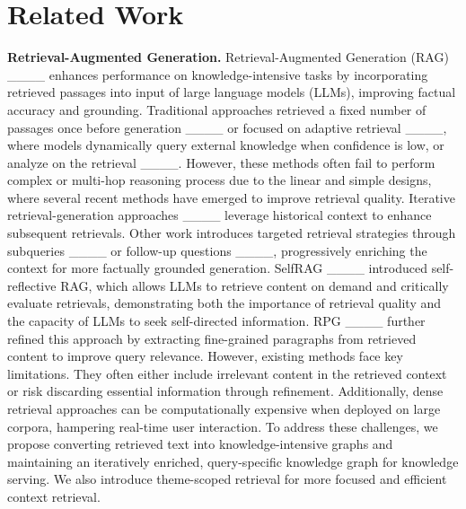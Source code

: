 \section{Related Work}
\textbf{Retrieval-Augmented Generation.} Retrieval-Augmented Generation (RAG) ____ enhances performance on knowledge-intensive tasks by incorporating retrieved passages into input of large language models (LLMs), improving factual accuracy and grounding. Traditional approaches retrieved a fixed number of passages once before generation ____ or focused on adaptive retrieval ____, where models dynamically query external knowledge when confidence is low, or analyze on the retrieval ____. However, these methods often fail to perform complex or multi-hop reasoning process due to the linear and simple designs, where several recent methods have emerged to improve retrieval quality. Iterative retrieval-generation approaches ____ leverage historical context to enhance subsequent retrievals. Other work introduces targeted retrieval strategies through subqueries ____ or follow-up questions ____, progressively enriching the context for more factually grounded generation. SelfRAG ____ introduced self-reflective RAG, which allows LLMs to retrieve content on demand and critically evaluate retrievals, demonstrating both the importance of retrieval quality and the capacity of LLMs to seek self-directed information. RPG ____ further refined this approach by extracting fine-grained paragraphs from retrieved content to improve query relevance.
However, existing methods face key limitations. They often either include irrelevant content in the retrieved context or risk discarding essential information through refinement. Additionally, dense retrieval approaches can be computationally expensive when deployed on large corpora, hampering real-time user interaction. To address these challenges, we propose converting retrieved text into knowledge-intensive graphs and maintaining an iteratively enriched, query-specific knowledge graph for knowledge serving. We also introduce theme-scoped retrieval for more focused and efficient context retrieval.


